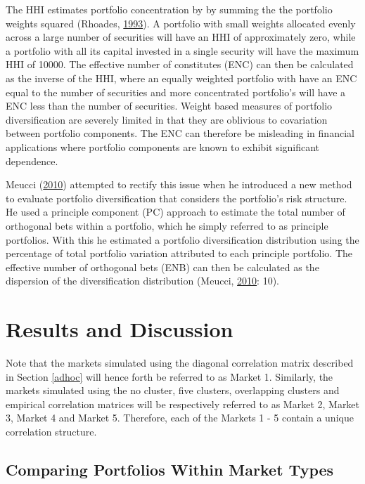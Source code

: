 \documentclass[11pt,preprint, authoryear]{elsarticle}
\numberwithin{equation}{section}
\numberwithin{figure}{section}
\numberwithin{table}{section}
\begin{document}
The HHI estimates portfolio concentration by by summing the the
portfolio weights squared (Rhoades,
\protect\hyperlink{ref-rhoades1993}{1993}). A portfolio with small
weights allocated evenly across a large number of securities will have
an HHI of approximately zero, while a portfolio with all its capital
invested in a single security will have the maximum HHI of 10000. The
effective number of constitutes (ENC) can then be calculated as the
inverse of the HHI, where an equally weighted portfolio with have an ENC
equal to the number of securities and more concentrated portfolio's will
have a ENC less than the number of securities. Weight based measures of
portfolio diversification are severely limited in that they are
oblivious to covariation between portfolio components. The ENC can
therefore be misleading in financial applications where portfolio
components are known to exhibit significant dependence.

Meucci (\protect\hyperlink{ref-meucci2010}{2010}) attempted to rectify
this issue when he introduced a new method to evaluate portfolio
diversification that considers the portfolio's risk structure. He used a
principle component (PC) approach to estimate the total number of
orthogonal bets within a portfolio, which he simply referred to as
principle portfolios. With this he estimated a portfolio diversification
distribution using the percentage of total portfolio variation
attributed to each principle portfolio. The effective number of
orthogonal bets (ENB) can then be calculated as the dispersion of the
diversification distribution (Meucci,
\protect\hyperlink{ref-meucci2010}{2010}: 10).

\hypertarget{results-and-discussion}{%
\section{\texorpdfstring{Results and Discussion
\label{reasults}}{Results and Discussion }}\label{results-and-discussion}}

Note that the markets simulated using the diagonal correlation matrix
described in Section \ref{adhoc} will hence forth be referred to as
Market 1. Similarly, the markets simulated using the no cluster, five
clusters, overlapping clusters and empirical correlation matrices will
be respectively referred to as Market 2, Market 3, Market 4 and Market
5. Therefore, each of the Markets 1 - 5 contain a unique correlation
structure.

\hypertarget{comparing-portfolios-within-market-types}{%
\subsection{Comparing Portfolios Within Market
Types}\label{comparing-portfolios-within-market-types}}
\end{document}
